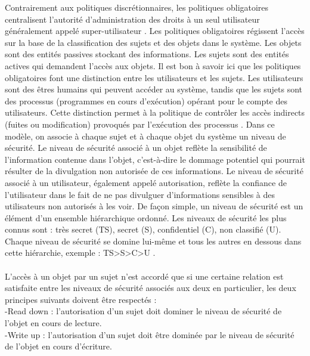 \label{sectionMAC}

Contrairement aux politiques discrétionnaires, les politiques obligatoires centralisent l'autorité d'administration des droits à un seul utilisateur généralement appelé super-utilisateur \cite{lindqvist06}. Les politiques obligatoires régissent l'accès sur la base de la classification des sujets et des objets dans le système. Les objets sont des entités passives stockant des informations. Les sujets sont des entités actives qui demandent l'accès aux objets. Il est bon à savoir ici que les politiques obligatoires font une distinction entre les utilisateurs et les sujets. Les utilisateurs sont des êtres humains qui peuvent accéder au système, tandis que les sujets sont des processus (programmes en cours d'exécution) opérant pour le compte des utilisateurs. Cette distinction permet à la politique de contrôler les accès indirects (fuites ou modification) provoqués par l'exécution des processus \cite{samarati00}. Dans ce modèle, on associe à chaque sujet et à chaque objet du système un niveau de sécurité. Le niveau de sécurité associé à un objet reflète la sensibilité de l'information contenue dans l'objet, c'est-à-dire le dommage potentiel qui pourrait résulter de la divulgation non autorisée de ces informations. Le niveau de sécurité associé à un utilisateur, également appelé autorisation, reflète la confiance de l'utilisateur dans le fait de ne pas divulguer d'informations sensibles à des utilisateurs non autorisés à les voir. De façon simple, un niveau de sécurité est un élément d'un ensemble hiérarchique ordonné. Les niveaux de sécurité les plus connus sont : très secret (TS), secret (S), confidentiel (C), non classifié (U). Chaque niveau de sécurité se domine lui-même et tous les autres en dessous dans cette hiérarchie, exemple : TS>S>C>U \cite{sandhu94}.
\paragraph{} L'accès à un objet par un sujet n'est accordé que si une certaine relation est satisfaite entre les niveaux de sécurité associés aux deux en particulier, les deux principes suivants doivent être respectés \cite{sandhu94} :\\
-Read down : l'autorisation d'un sujet doit dominer le niveau de sécurité de l'objet en cours de lecture.\\
-Write up : l'autorisation d'un sujet doit être dominée par le niveau de sécurité de l'objet en cours d'écriture.
